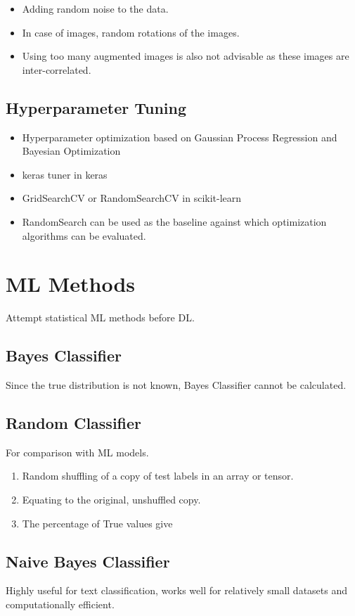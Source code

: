 \documentclass[a4paper, 12pt]{report}
\begin{document}
\begin{itemize}
\item Adding random noise to the data.
\item In case of images, random rotations of the images.
\item Using too many augmented images is also not advisable as these images are inter-correlated.
\end{itemize}

\section{Hyperparameter Tuning}
\begin{itemize}
\item Hyperparameter optimization based on Gaussian Process Regression and Bayesian Optimization
\item keras tuner in keras
\item GridSearchCV or RandomSearchCV in scikit-learn
\item RandomSearch can be used as the baseline against which optimization algorithms can be evaluated.
\end{itemize}

\chapter{ML Methods}
Attempt statistical ML methods before DL.

\section{Bayes Classifier}
Since the true distribution is not known, Bayes Classifier cannot be calculated.

\section{Random Classifier}
For comparison with ML models.
\begin{enumerate}
\item Random shuffling of a copy of test labels in an array or tensor.
\item Equating to the original, unshuffled copy.
\item The percentage of True values give
\end{enumerate}

\section{Naive Bayes Classifier}
Highly useful for text classification, works well for relatively small datasets and computationally efficient. 
\end{document}
